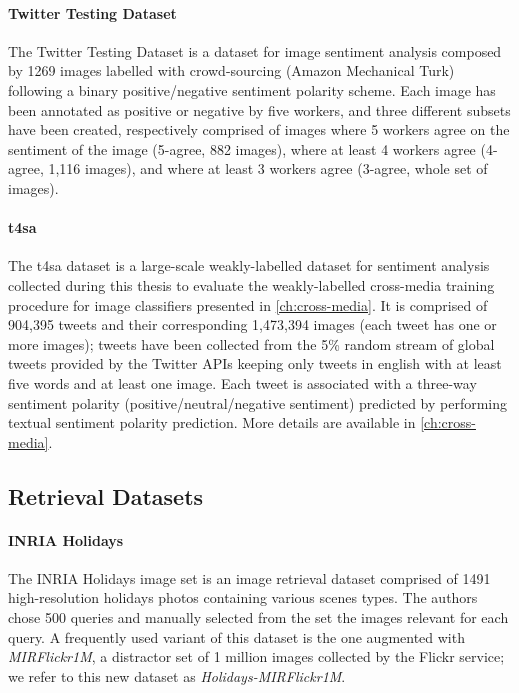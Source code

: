 \paragraph{Twitter Testing Dataset~\cite{you2015robust}}
The Twitter Testing Dataset is a dataset for image sentiment analysis composed by 1269 images labelled with crowd-sourcing (Amazon Mechanical Turk) following a binary positive/negative sentiment polarity scheme.
Each image has been annotated as positive or negative by five workers, and three different subsets have been created, respectively comprised of images where 5 workers agree on the sentiment of the image (5-agree, 882 images), where at least 4 workers agree (4-agree, 1,116 images), and where at least 3 workers agree (3-agree, whole set of images).

\paragraph{\acrfull{t4sa}~\cite{vadicamo2017cross}}
The \acrlong{t4sa} dataset is a large-scale weakly-labelled dataset for sentiment analysis collected during this thesis to evaluate the weakly-labelled cross-media training procedure for image classifiers presented in \ref{ch:cross-media}.
It is comprised of 904,395 tweets and their corresponding 1,473,394 images (each tweet has one or more images);
tweets have been collected from the 5\% random stream of global tweets provided by the Twitter APIs keeping only tweets in english with at least five words and at least one image.
Each tweet is associated with a three-way sentiment polarity (positive/neutral/negative sentiment) predicted by performing textual sentiment polarity prediction.
More details are available in \ref{ch:cross-media}.

\subsection{Retrieval Datasets}

\paragraph{INRIA Holidays~\cite{jegou2008hamming}}

The INRIA Holidays image set is an image retrieval dataset comprised of 1491 high-resolution holidays photos containing various scenes types.
The authors chose 500 queries and manually selected from the set the images relevant for each query.
A frequently used variant of this dataset is the one augmented with \emph{MIRFlickr1M}, a distractor set of 1 million images collected by the Flickr service;
we refer to this new dataset as \emph{Holidays-MIRFlickr1M}.

